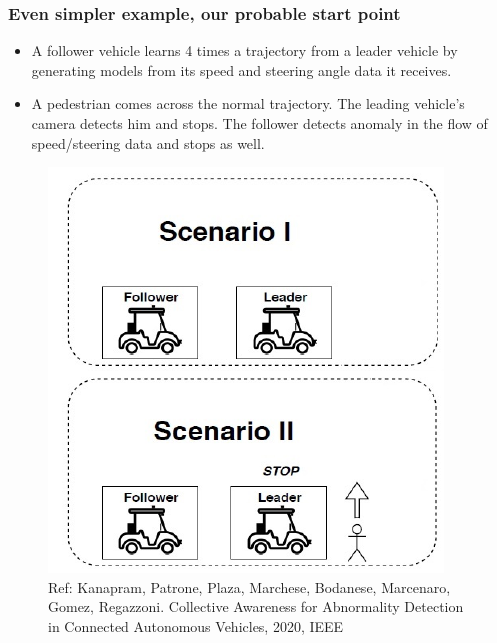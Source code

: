\documentclass{beamer}
\begin{document}
	\begin{frame}
		\frametitle{Even simpler example, our probable start point}
		\begin{itemize}
			\item A follower vehicle learns 4 times a trajectory from a leader vehicle by generating models from its speed and steering angle data it receives.
			\item A pedestrian comes across the normal trajectory. The leading vehicle's camera detects him and stops. The follower detects anomaly in the flow of speed/steering data and stops as well.  
		\end{itemize}
		\begin{figure}
			\includegraphics[scale=0.35]{two-icabs.png}
			\caption{Ref: Kanapram, Patrone, Plaza, Marchese, Bodanese, Marcenaro, Gomez, Regazzoni. Collective Awareness for Abnormality Detection in Connected Autonomous Vehicles, 2020, IEEE}
			\label{simple-collective-intelligence}
		\end{figure}	
	\end{frame}
\end{document}
